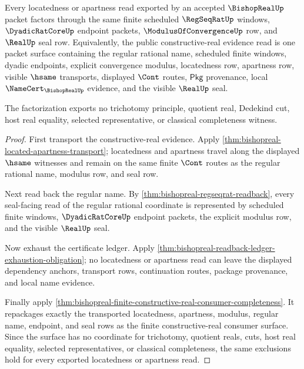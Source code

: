 \begin{theorem}
\label{thm:bishopreal-located-apartness-seal-factorization}
Every locatedness or apartness read exported by an accepted $\BishopRealUp$
packet factors through the same finite scheduled $\RegSeqRatUp$ windows,
$\DyadicRatCoreUp$ endpoint packets, $\ModulusOfConvergenceUp$ row, and
$\RealUp$ seal row. Equivalently, the public constructive-real evidence read is
one packet surface containing the regular rational name, scheduled finite
windows, dyadic endpoints, explicit convergence modulus, locatedness row,
apartness row, visible $\hsame$ transports, displayed $\Cont$ routes,
$\mathsf{Pkg}$ provenance, local $\NameCert_{\BishopRealUp}$ evidence, and the
visible $\RealUp$ seal.

The factorization exports no trichotomy principle, quotient real, Dedekind cut,
host real equality, selected representative, or classical completeness
witness.
\end{theorem}
\begin{proof}
First transport the constructive-real evidence. Apply
\autoref{thm:bishopreal-located-apartness-transport}; locatedness and apartness
travel along the displayed $\hsame$ witnesses and remain on the same finite
$\Cont$ routes as the regular rational name, modulus row, and seal row.

Next read back the regular name. By
\autoref{thm:bishopreal-regseqrat-readback}, every seal-facing read of the
regular rational coordinate is represented by scheduled finite windows,
$\DyadicRatCoreUp$ endpoint packets, the explicit modulus row, and the visible
$\RealUp$ seal.

Now exhaust the certificate ledger. Apply
\autoref{thm:bishopreal-readback-ledger-exhaustion-obligation}; no locatedness
or apartness read can leave the displayed dependency anchors, transport rows,
continuation routes, package provenance, and local name evidence.

Finally apply
\autoref{thm:bishopreal-finite-constructive-real-consumer-completeness}. It
repackages exactly the transported locatedness, apartness, modulus, regular
name, endpoint, and seal rows as the finite constructive-real consumer surface.
Since the surface has no coordinate for trichotomy, quotient reals, cuts, host
real equality, selected representatives, or classical completeness, the same
exclusions hold for every exported locatedness or apartness read.
\end{proof}

